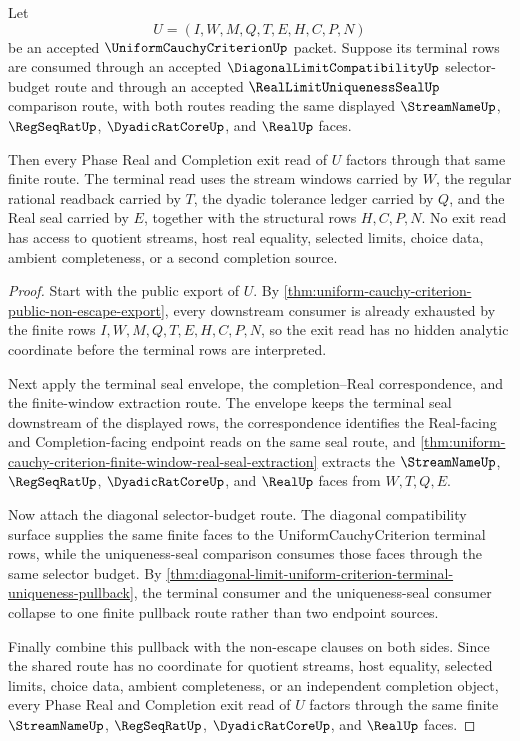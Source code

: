 \begin{theorem}
\label{thm:uniform-cauchy-criterion-diagonal-uniqueness-exit}
Let
$$
U=(I,W,M,Q,T,E,H,C,P,N)
$$
be an accepted $\UniformCauchyCriterionUp$ packet. Suppose its terminal rows are consumed through an accepted $\DiagonalLimitCompatibilityUp$ selector-budget route and through an accepted $\RealLimitUniquenessSealUp$ comparison route, with both routes reading the same displayed $\StreamNameUp$, $\RegSeqRatUp$, $\DyadicRatCoreUp$, and $\RealUp$ faces.

Then every Phase Real and Completion exit read of $U$ factors through that same finite route. The terminal read uses the stream windows carried by $W$, the regular rational readback carried by $T$, the dyadic tolerance ledger carried by $Q$, and the Real seal carried by $E$, together with the structural rows $H,C,P,N$. No exit read has access to quotient streams, host real equality, selected limits, choice data, ambient completeness, or a second completion source.
\end{theorem}
\begin{proof}
Start with the public export of $U$. By \autoref{thm:uniform-cauchy-criterion-public-non-escape-export}, every downstream consumer is already exhausted by the finite rows $I,W,M,Q,T,E,H,C,P,N$, so the exit read has no hidden analytic coordinate before the terminal rows are interpreted.

Next apply the terminal seal envelope, the completion--Real correspondence, and the finite-window extraction route. The envelope keeps the terminal seal downstream of the displayed rows, the correspondence identifies the Real-facing and Completion-facing endpoint reads on the same seal route, and \autoref{thm:uniform-cauchy-criterion-finite-window-real-seal-extraction} extracts the $\StreamNameUp$, $\RegSeqRatUp$, $\DyadicRatCoreUp$, and $\RealUp$ faces from $W,T,Q,E$.

Now attach the diagonal selector-budget route. The diagonal compatibility surface supplies the same finite faces to the UniformCauchyCriterion terminal rows, while the uniqueness-seal comparison consumes those faces through the same selector budget. By \autoref{thm:diagonal-limit-uniform-criterion-terminal-uniqueness-pullback}, the terminal consumer and the uniqueness-seal consumer collapse to one finite pullback route rather than two endpoint sources.

Finally combine this pullback with the non-escape clauses on both sides. Since the shared route has no coordinate for quotient streams, host equality, selected limits, choice data, ambient completeness, or an independent completion object, every Phase Real and Completion exit read of $U$ factors through the same finite $\StreamNameUp$, $\RegSeqRatUp$, $\DyadicRatCoreUp$, and $\RealUp$ faces.
\end{proof}

